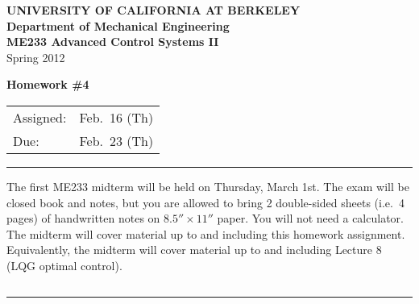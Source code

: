 \documentclass[letterpaper,12pt]{article}
\begin{document}
\begin{center}
    {\bf UNIVERSITY OF CALIFORNIA AT BERKELEY}\\
    {\bf Department of Mechanical Engineering}\\
    {\bf ME233 Advanced Control Systems II}\\
    Spring 2012\\
\end{center}
\noindent
{\Large \bf Homework \#4 }\\[-3em]
\begin{flushright}
\begin{tabular} {l l}
    Assigned: &  Feb.\ 16 (Th) \\
    Due: & Feb.\ 23 (Th)
\end{tabular}
\end{flushright}

\noindent
\rule{6.5in}{.1em}
$\:$\\

\noindent
The first ME233 midterm will be held on Thursday, March 1st. The exam will be closed book and notes, but you are allowed to bring 2 double-sided sheets (i.e.\ 4 pages) of handwritten notes on $8.5'' \times 11''$ paper. You will not need a calculator. The midterm will cover material up to and including this homework assignment. Equivalently, the midterm will cover material up to and including Lecture 8 (LQG optimal control).

$\:$\\
\rule{6.5in}{.1em}
$\:$\\

\begin{enumerate}



\newpage


\end{enumerate}
\end{document}
